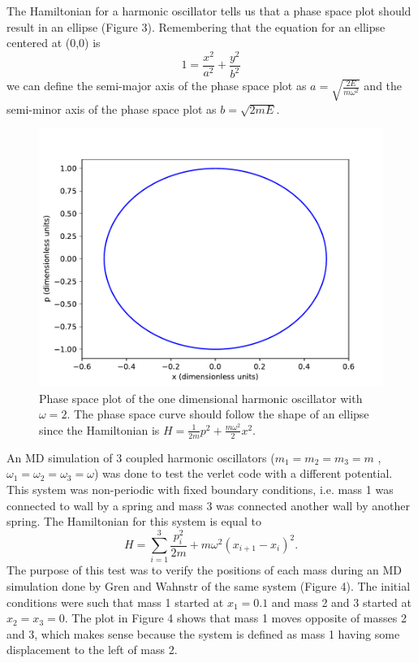 \documentclass{article}
\newcommand{\be}{\begin{equation}}
\newcommand{\ee}{\end{equation}}
\begin{document}
The Hamiltonian for a harmonic oscillator tells us that a phase space plot should result in an ellipse (Figure 3).
Remembering that the equation for an ellipse centered at (0,0) is
\be
  1 = \frac{x^2}{a^2} + \frac{y^2}{b^2}
\ee
we can define the semi-major axis of the phase space plot as $a = \sqrt{\frac{2E}{m \omega^2}}$ and the semi-minor axis of the phase space plot as $b = \sqrt{2mE}$.
\begin{figure}[H]
  \centering
  \includegraphics[scale=0.7]{Figures/1dverlet/phasespace_w2.pdf}
    \caption{Phase space plot of the one dimensional harmonic oscillator with $\omega = 2$. The phase space curve should follow the shape of an ellipse since the Hamiltonian is $H = \frac{1}{2m}p^2 + \frac{m \omega^2}{2}x^2$.}
\end{figure}
An MD simulation of 3 coupled harmonic oscillators ($m_1 = m_2 = m_3 = m$ , $\omega_1 = \omega_2 = \omega_3 = \omega$) was done to test the verlet code with a different potential.
This system was non-periodic with fixed boundary conditions, i.e. mass 1 was connected to wall by a spring and mass 3 was connected another wall by another spring.
The Hamiltonian for this system is equal to
\be
  H = \sum_{i=1}^{3} \frac{p_i^2}{2 m} + m \omega^2 (x_{i+1} - x_{i})^2 .
\ee
The purpose of this test was to verify the positions of each mass during an MD simulation done by Gren and Wahnstr of the same system (Figure 4).
The initial conditions were such that mass 1 started at $x_1 = 0.1$ and mass 2 and 3 started at $x_2 = x_3 = 0$.
The plot in Figure 4 shows that mass 1 moves opposite of masses 2 and 3, which makes sense because the system is defined as mass 1 having some displacement to the left of mass 2.
\end{document}
